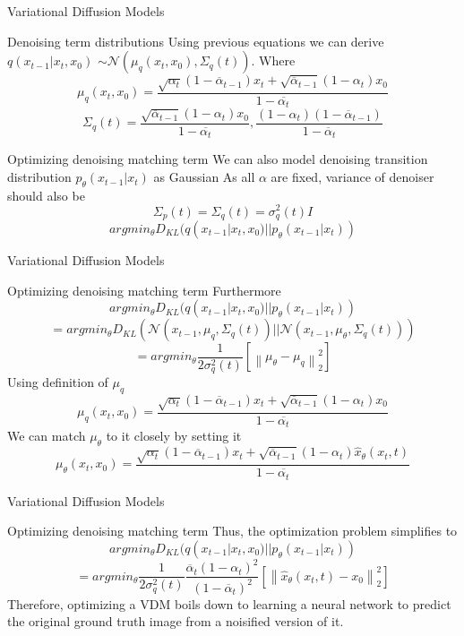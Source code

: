 \documentclass{beamer}
\newcommand\norm[1]{\left\lVert#1\right\rVert}
\begin{document}
\begin{frame}{Variational Diffusion Models}
    \begin{block}{Denoising term distributions}
    Using previous equations we can derive $q(x_{t-1}|x_t, x_0)$ $\sim \mathcal{N}\left(\mu_q(x_t, x_0), \Sigma_q(t)\right)$.
    Where
    \[\mu_q(x_t, x_0) = \dfrac{\sqrt{\alpha_t}(1 - \overline{\alpha}_{t-1})x_t + \sqrt{\overline{\alpha}_{t-1}}(1 - \alpha_t)x_0}{1 - \overline{\alpha_t}}\]
    \[\Sigma_q(t) = \frac{\sqrt{\overline{\alpha}_{t-1}}(1 - \alpha_t)x_0}{1 - \overline{\alpha_t}}, \dfrac{(1 - \alpha_t)(1 - \overline{\alpha}_{t-1})}{1 - \overline{\alpha}_{t}}\]
    \end{block}
    \begin{block}{Optimizing denoising matching term}
    We can also model denoising transition distribution $p_{\theta}(x_{t-1}|x_t)$ as Gaussian
    As all $\alpha$ are fixed, variance of denoiser should also be
    \[\Sigma_p(t) = \Sigma_q(t) = \sigma^2_q(t) I\]
    \[argmin_{\theta} D_{KL}(q(x_{t-1}|x_t, x_0) || p_{\theta}(x_{t-1}|x_t))\]
    \end{block}
\end{frame}

\begin{frame}{Variational Diffusion Models}
    \begin{block}{Optimizing denoising matching term}
    Furthermore
    \[argmin_{\theta} D_{KL}(q(x_{t-1}|x_t, x_0) || p_{\theta}(x_{t-1}|x_t))\]
    \[= argmin_{\theta} D_{KL} \left(\mathcal{N}(x_{t-1}, \mu_q, \Sigma_q(t)) || \mathcal{N}(x_{t-1}, \mu_{\theta}, \Sigma_q(t))\right)\]
    \[= argmin_{\theta} \dfrac{1}{2\sigma^2_q(t)}\left[\norm{\mu_{\theta}-\mu_q}_2^2\right]\]
    Using definition of $\mu_q$
     \[\mu_q(x_t, x_0) = \dfrac{\sqrt{\alpha_t}(1 - \overline{\alpha}_{t-1})x_t + \sqrt{\overline{\alpha}_{t-1}}(1 - \alpha_t)x_0}{1 - \overline{\alpha_t}}\]
     We can match $\mu_{\theta}$ to it closely by setting it 
     \[\mu_{\theta}(x_t, x_0) = \dfrac{\sqrt{\alpha_t}(1 - \overline{\alpha}_{t-1})x_t + \sqrt{\overline{\alpha}_{t-1}}(1 - \alpha_t)\widehat{x}_\theta(x_t, t)}{1 - \overline{\alpha_t}}\]
    \end{block}
\end{frame}

\begin{frame}{Variational Diffusion Models}
    \begin{block}{Optimizing denoising matching term}
    Thus, the optimization problem simplifies to
    \[argmin_{\theta} D_{KL}(q(x_{t-1}|x_t, x_0) || p_{\theta}(x_{t-1}|x_t))\]
    \[= argmin_{\theta} \dfrac{1}{2\sigma^2_q(t)} \dfrac{\overline{\alpha}_t (1 - \alpha_t)^2}{(1 - \overline{\alpha}_t)^2}{}\left[\norm{\widehat{x}_\theta(x_t, t)-x_0}_2^2\right]\]
    Therefore, optimizing a VDM boils down to learning a neural network to predict the original ground truth
    image from a noisified version of it.
    \end{block}
\end{frame}
\end{document}
